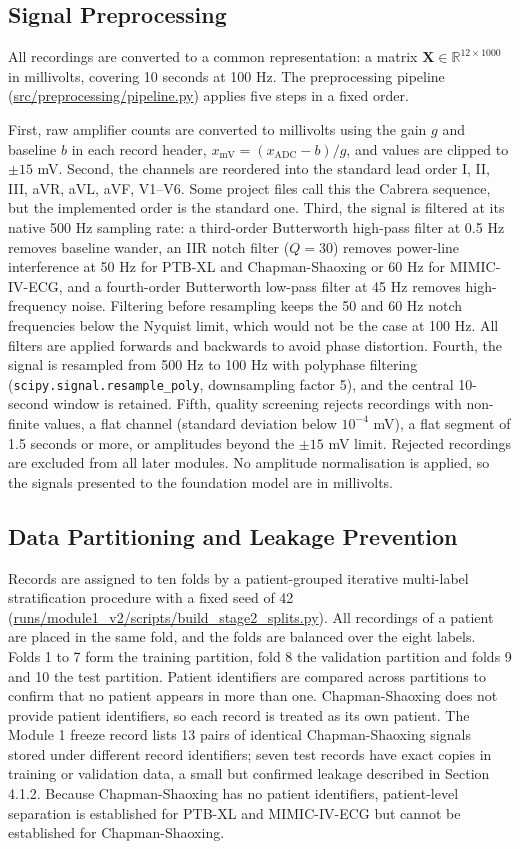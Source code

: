 \subsection{Signal Preprocessing}
All recordings are converted to a common representation: a matrix $\mathbf{X} \in \mathbb{R}^{12 \times 1000}$ in millivolts, covering 10 seconds at 100 Hz. The preprocessing pipeline (\url{src/preprocessing/pipeline.py}) applies five steps in a fixed order.

First, raw amplifier counts are converted to millivolts using the gain $g$ and baseline $b$ in each record header, $x_{\text{mV}} = (x_{\text{ADC}} - b)/g$, and values are clipped to $\pm 15$ mV. Second, the channels are reordered into the standard lead order I, II, III, aVR, aVL, aVF, V1--V6. Some project files call this the Cabrera sequence, but the implemented order is the standard one. Third, the signal is filtered at its native 500 Hz sampling rate: a third-order Butterworth high-pass filter at 0.5 Hz removes baseline wander, an IIR notch filter ($Q = 30$) removes power-line interference at 50 Hz for PTB-XL and Chapman-Shaoxing or 60 Hz for MIMIC-IV-ECG, and a fourth-order Butterworth low-pass filter at 45 Hz removes high-frequency noise. Filtering before resampling keeps the 50 and 60 Hz notch frequencies below the Nyquist limit, which would not be the case at 100 Hz. All filters are applied forwards and backwards to avoid phase distortion. Fourth, the signal is resampled from 500 Hz to 100 Hz with polyphase filtering (\texttt{scipy.signal.resample\_poly}, downsampling factor 5), and the central 10-second window is retained. Fifth, quality screening rejects recordings with non-finite values, a flat channel (standard deviation below $10^{-4}$ mV), a flat segment of 1.5 seconds or more, or amplitudes beyond the $\pm 15$ mV limit. Rejected recordings are excluded from all later modules. No amplitude normalisation is applied, so the signals presented to the foundation model are in millivolts.


\subsection{Data Partitioning and Leakage Prevention}
Records are assigned to ten folds by a patient-grouped iterative multi-label stratification procedure with a fixed seed of 42 (\url{runs/module1_v2/scripts/build_stage2_splits.py}). All recordings of a patient are placed in the same fold, and the folds are balanced over the eight labels. Folds 1 to 7 form the training partition, fold 8 the validation partition and folds 9 and 10 the test partition. Patient identifiers are compared across partitions to confirm that no patient appears in more than one. Chapman-Shaoxing does not provide patient identifiers, so each record is treated as its own patient. The Module 1 freeze record lists 13 pairs of identical Chapman-Shaoxing signals stored under different record identifiers; seven test records have exact copies in training or validation data, a small but confirmed leakage described in Section 4.1.2. Because Chapman-Shaoxing has no patient identifiers, patient-level separation is established for PTB-XL and MIMIC-IV-ECG but cannot be established for Chapman-Shaoxing.

